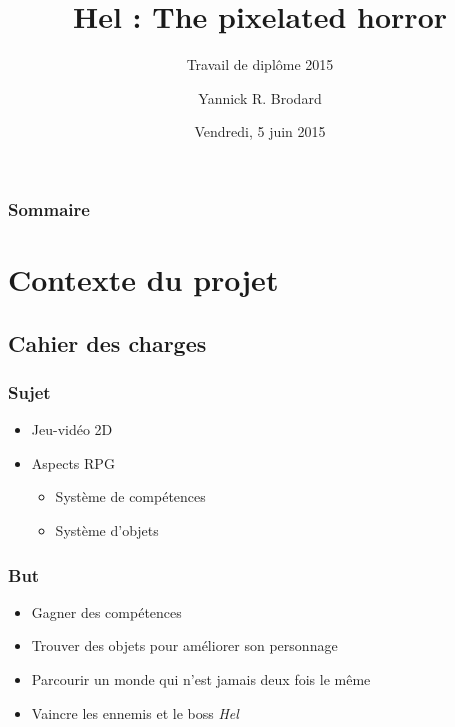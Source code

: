 \documentclass{beamer}
\title[Hel : The pixelated horror]{Hel : The pixelated horror}
\subtitle{Travail de diplôme 2015}
\author{Yannick R. Brodard}
\institute{Centre de Formation Professionnelle Technique\\École d'informatique}
\date{Vendredi, 5 juin 2015}
\begin{document}
\frame{\titlepage}

\begin{frame}
\frametitle{Sommaire}
\tableofcontents[hideallsubsections]
\end{frame}


\section{Contexte du projet}
\subsection{Cahier des charges}
\begin{frame}
\frametitle{Sujet}
\begin{itemize}
	\item Jeu-vidéo 2D
	\item Aspects RPG
	\begin{itemize}
		\item Système de compétences
		\item Système d'objets
	\end{itemize}
\end{itemize}
\end{frame}

\begin{frame}
\frametitle{But}
\begin{itemize}
	\item Gagner des compétences
	\item Trouver des objets pour améliorer son personnage
	\item Parcourir un monde qui n'est jamais deux fois le même
	\item Vaincre les ennemis et le boss \textit{Hel}
\end{itemize}
\end{frame}
\end{document}
